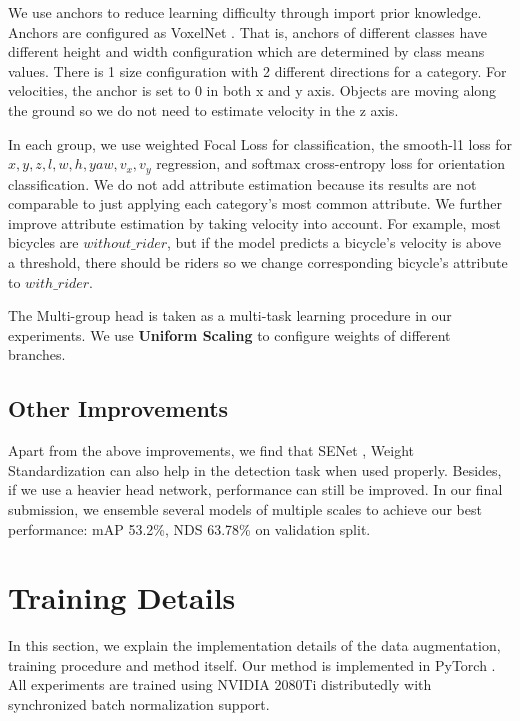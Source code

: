 \documentclass[10pt,twocolumn,letterpaper]{article}
\begin{document}
We use anchors to reduce learning difficulty through import prior knowledge. Anchors are configured as VoxelNet \cite{Zhou_2018_CVPR}. That is, anchors of different classes have different height and width configuration which are determined by class means values. There is 1 size configuration with 2 different directions for a category. For velocities, the anchor is set to 0 in both x and y axis. Objects are moving along the ground so we do not need to estimate velocity in the z axis.

In each group, we use weighted Focal Loss for classification, the smooth-l1 loss for $x, y, z, l, w, h, yaw, v_x, v_y$ regression, and softmax cross-entropy loss for orientation classification. We do not add attribute estimation because its results are not comparable to just applying each category's most common attribute. We further improve attribute estimation by taking velocity into account. For example, most bicycles are $without\_rider$, but if the model predicts a bicycle's velocity is above a threshold, there should be riders so we change corresponding bicycle's attribute to $with\_rider$.

The Multi-group head is taken as a multi-task learning procedure in our experiments. We use \textbf{Uniform Scaling} to configure weights of different branches.

\subsection{Other Improvements}

Apart from the above improvements, we find that SENet \cite{Hu_2018_CVPR}, Weight Standardization \cite{DBLP:journals/corr/abs-1903-10520} can also help in the detection task when used properly. Besides, if we use a heavier head network, performance can still be improved. In our final submission, we ensemble several models of multiple scales to achieve our best performance: mAP 53.2\%, NDS 63.78\% on validation split.

\section{Training Details} \label{sec:training}

In this section, we explain the implementation details of the data augmentation, training procedure and method itself. Our method is implemented in PyTorch \cite{paszke2017automatic}. All experiments are trained using NVIDIA 2080Ti distributedly with synchronized batch normalization support.
\end{document}
